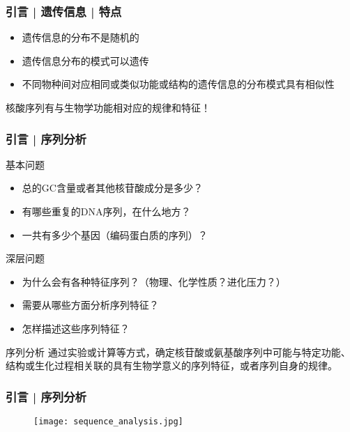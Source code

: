 \begin{frame}
  \frametitle{引言 | 遗传信息 | 特点}
  \begin{itemize}
    \item 遗传信息的分布不是随机的
    \item 遗传信息分布的模式可以遗传
    \item 不同物种间对应相同或类似功能或结构的遗传信息的分布模式具有相似性
  \end{itemize}
  \begin{center}
    \Large{核酸序列有与生物学功能相对应的规律和特征！}
  \end{center}
\end{frame}

\begin{frame}
  \frametitle{引言 | 序列分析}
  \begin{block}{基本问题}
    \begin{itemize}
      \item 总的GC含量或者其他核苷酸成分是多少？
      \item 有哪些重复的DNA序列，在什么地方？
      \item 一共有多少个基因（编码蛋白质的序列）？
    \end{itemize}
  \end{block}
  \vspace{-0.3em}
  \pause
  \begin{block}{深层问题}
    \begin{itemize}
      \item 为什么会有各种特征序列？（物理、化学性质？进化压力？）
      \item 需要从哪些方面分析序列特征？
      \item 怎样描述这些序列特征？
    \end{itemize}
  \end{block}
  \vspace{-0.3em}
  \pause
  \begin{block}{序列分析}
    通过实验或计算等方式，确定核苷酸或氨基酸序列中可能与特定功能、结构或生化过程相关联的\alert{具有生物学意义的序列特征}，或者\alert{序列自身的规律}。
  \end{block}
\end{frame}

\begin{frame}
  \frametitle{引言 | 序列分析}
  \begin{figure}
    \centering
    \texttt{[image: sequence\_analysis.jpg]}
  \end{figure}
\end{frame}

